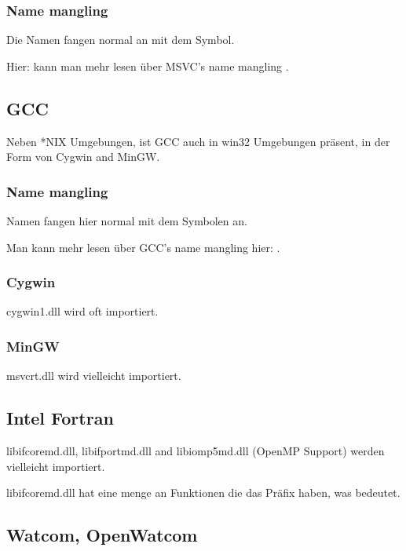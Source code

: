 \subsubsection{Name mangling} 

Die Namen fangen normal an mit dem  Symbol.

Hier:  kann man mehr lesen \"uber MSVC's \gls{name mangling} . 

\subsection{GCC}

Neben *NIX Umgebungen, ist GCC auch in win32 Umgebungen pr\"asent, in der Form von Cygwin and MinGW. 

\subsubsection{Name mangling} 

Namen fangen hier normal mit dem  Symbolen an.

Man kann mehr lesen \"uber GCC's \gls{name mangling} hier: .

\subsubsection{Cygwin}

cygwin1.dll wird oft importiert.

\subsubsection{MinGW}

msvcrt.dll wird vielleicht importiert.

\subsection{Intel Fortran}


libifcoremd.dll, libifportmd.dll and libiomp5md.dll (OpenMP Support) werden vielleicht importiert.

libifcoremd.dll hat eine menge an Funktionen die das  Pr\"afix haben, was  bedeutet.

\subsection{Watcom, OpenWatcom}

